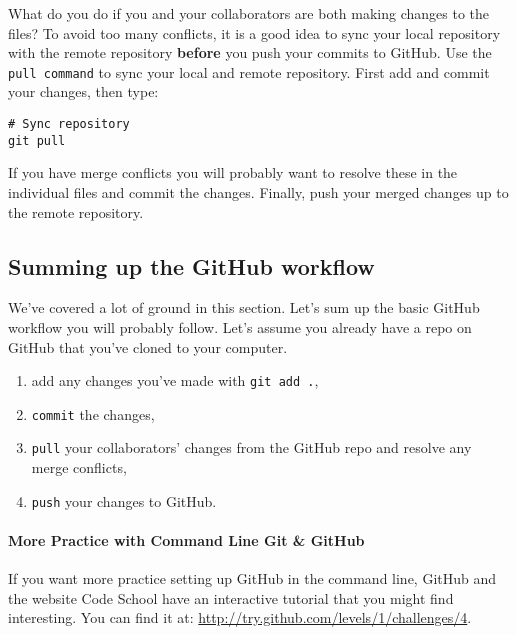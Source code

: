 What do you do if you and your collaborators are both making changes to the files? To avoid too many conflicts, it is a good idea to sync your local repository with the remote repository \textbf{before} you push your commits to GitHub. Use the \texttt{pull command} to sync your local and remote repository. First add and commit your changes, then type:

\begin{knitrout}
\color{fgcolor}\begin{kframe}
\begin{verbatim}
# Sync repository
git pull 
\end{verbatim}
\end{kframe}
\end{knitrout}


\noindent If you have merge conflicts you will probably want to resolve these in the individual files and commit the changes. Finally, push your merged changes up to the remote repository.

\subsection{Summing up the GitHub workflow}

We've covered a lot of ground in this section. Let's sum up the basic GitHub workflow you will probably follow. Let's assume you already have a repo on GitHub that you've cloned to your computer. 

\begin{enumerate}
    \item add any changes you've made with \texttt{git add .},
    \item \texttt{commit} the changes,
    \item \texttt{pull} your collaborators' changes from the GitHub repo and resolve any merge conflicts,
    \item \texttt{push} your changes to GitHub. 
\end{enumerate}

\paragraph{More Practice with Command Line Git \& GitHub}

If you want more practice setting up GitHub in the command line, GitHub and the website Code School have an interactive tutorial that you might find interesting. You can find it at: \url{http://try.github.com/levels/1/challenges/4}.

